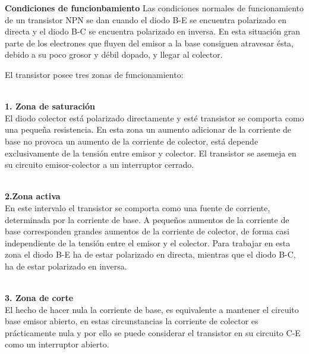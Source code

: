 \documentclass[10pt,a4paper]{article}
\begin{document}
\textbf{Condiciones de funcionbamiento}
Las condiciones normales de funcionamiento de un transistor NPN se dan cuando el diodo B-E se encuentra polarizado en directa y el diodo B-C se encuentra polarizado en inversa. En esta situación gran parte de los electrones que fluyen del emisor a la base consiguen atravesar ésta, debido a su poco grosor y débil dopado, y llegar al colector. 

El transistor posee tres zonas de funcionamiento:\\\

\textbf{1. Zona de saturación}\\
El diodo colector está polarizado directamente y esté transistor se comporta como una pequeña resistencia. En esta zona un aumento adicionar de la corriente de base no provoca un aumento de la corriente de colector, está depende exclusivamente de la tensión entre emisor y colector. El transistor se asemeja en su circuito emisor-colector a un interruptor cerrado. \\\

\textbf{2.Zona activa}\\
En este intervalo el transistor se comporta como una fuente de corriente, determinada por la corriente de base. A pequeños aumentos de la corriente de base corresponden grandes aumentos de la corriente de colector, de forma casi independiente de la tensión entre el emisor y el colector. Para trabajar en esta zona el diodo B-E ha de estar polarizado en directa, mientras que el diodo B-C, ha de estar polarizado en inversa. \\\

\textbf{3. Zona de corte}\\
El hecho de hacer nula la corriente de base, es equivalente a mantener el circuito base emisor abierto, en estas circunstancias la corriente de colector es prácticamente nula y por ello se puede considerar el transistor en su circuito C-E como un interruptor abierto. 
\end{document}
